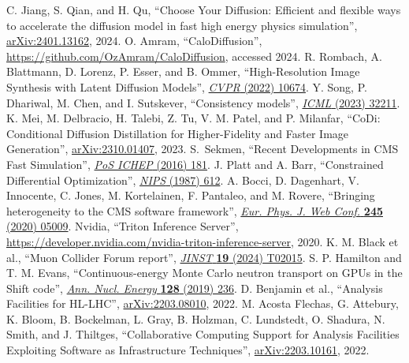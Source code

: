 \begin{thebibliography}{99}
 C. Jiang, S. Qian, and H. Qu, ``Choose Your Diffusion: Efficient and flexible ways to accelerate the diffusion model in fast high energy physics simulation'', \href{https://arxiv.org/abs/2401.13162}{arXiv:2401.13162}, 2024.
 O. Amram, ``CaloDiffusion'', \href{https://github.com/OzAmram/CaloDiffusion}{https://github.com/OzAmram/CaloDiffusion}, accessed 2024.
 R. Rombach, A. Blattmann, D. Lorenz, P. Esser, and B. Ommer, ``High-Resolution Image Synthesis with Latent Diffusion Models'', \href{https://doi.ieeecomputersociety.org/10.1109/CVPR52688.2022.01042}{\textit{CVPR} (2022) 10674}.
 Y. Song, P. Dhariwal, M. Chen, and I. Sutskever, ``Consistency models'', \href{https://dl.acm.org/doi/10.5555/3618408.3619743}{\textit{ICML} (2023) 32211}.
 K. Mei, M. Delbracio, H. Talebi, Z. Tu, V. M. Patel, and P. Milanfar, ``CoDi: Conditional Diffusion Distillation for Higher-Fidelity and Faster Image Generation'', \href{https://arxiv.org/abs/2310.01407}{arXiv:2310.01407}, 2023.
 S.~Sekmen, ``Recent Developments in CMS Fast Simulation'', \href{https://doi.org/10.22323/1.282.0181}{\textit{PoS ICHEP} (2016) 181}.
 J. Platt and A. Barr, ``Constrained Differential Optimization'', \href{https://proceedings.neurips.cc/paper/1987/hash/a87ff679a2f3e71d9181a67b7542122c-Abstract.html}{\textit{NIPS} (1987) 612}.
 A. Bocci, D. Dagenhart, V. Innocente, C. Jones, M. Kortelainen, F. Pantaleo, and M. Rovere, ``Bringing heterogeneity to the CMS software framework'', \href{https://doi.org/10.1051/epjconf/202024505009}{\textit{Eur. Phys. J. Web Conf.} \textbf{245} (2020) 05009}.
 Nvidia, ``Triton Inference Server'', \href{https://developer.nvidia.com/nvidia-triton-inference-server}{https://developer.nvidia.com/nvidia-triton-inference-server}, 2020.
 K. M. Black et al., ``Muon Collider Forum report'', \href{https://doi.org/10.1088/1748-0221/19/02/T02015}{\textit{JINST} \textbf{19} (2024) T02015}.
 S. P. Hamilton and T. M. Evans, ``Continuous-energy Monte Carlo neutron transport on GPUs in the Shift code'', \href{https://doi.org/10.1016/j.anucene.2019.01.012}{\textit{Ann. Nucl. Energy} \textbf{128} (2019) 236}.
 D. Benjamin et al., ``Analysis Facilities for HL-LHC'', \href{https://arxiv.org/abs/2203.08010}{arXiv:2203.08010}, 2022.
 M. Acosta Flechas, G. Attebury, K. Bloom, B. Bockelman, L. Gray, B. Holzman, C. Lundstedt, O. Shadura, N. Smith, and J. Thiltges, ``Collaborative Computing Support for Analysis Facilities Exploiting Software as Infrastructure Techniques'', \href{https://arxiv.org/abs/2203.10161}{arXiv:2203.10161}, 2022.

\end{thebibliography}
